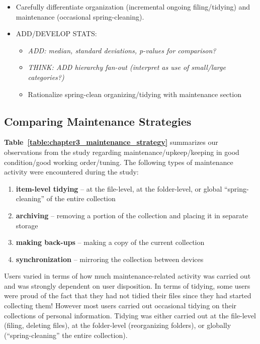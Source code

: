 \begin{footnotesize}

\begin{itemize}

	\item Carefully differentiate organization (incremental ongoing filing/tidying) and maintenance (occasional spring-cleaning).

	\item ADD/DEVELOP STATS:
	\begin{itemize}
		\item \textit{ADD: median, standard deviations, p-values for comparison?}
		\item \textit{THINK: ADD hierarchy fan-out (interpret as use of small/large categories?)}
		\item Rationalize spring-clean organizing/tidying with maintenance section
	\end{itemize}
	
\end{itemize}

\end{footnotesize}



\newpage
\subsection{Comparing Maintenance Strategies}
\label{exp-study:qual_maintenance}

\textbf{Table~\ref{table:chapter3_maintenance_strategy}} summarizes our observations from the study regarding maintenance/upkeep/keeping in good condition/good working order/tuning. The following types of maintenance activity were encountered during the study:
\begin{enumerate}
	\item \textbf{item-level tidying} -- at the file-level, at the folder-level, or global ``spring-cleaning'' of the entire collection
	\item \textbf{archiving} -- removing a portion of the collection and placing it in separate storage
	\item \textbf{making back-ups} -- making a copy of the current collection
	\item \textbf{synchronization} -- mirroring the collection between devices
\end{enumerate}

\noindent
Users varied in terms of how much maintenance-related activity was carried out and was strongly dependent on user disposition. 
In terms of tidying, some users were proud of the fact that they had not tidied their files since they had started collecting them! However most users carried out occasional tidying on their collections of personal information.  Tidying was either carried out at the file-level (filing, deleting files), at the folder-level (reorganizing folders), or globally (``spring-cleaning'' the entire collection).
\\


